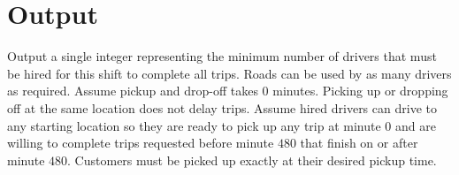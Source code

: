 \documentclass[11pt,letterpaper]{article}
\begin{document}
\section*{Output}
Output a single integer representing the minimum number of drivers that must be hired for this shift to complete all trips. Roads can be used by as many drivers as required. Assume pickup and drop-off takes $0$ minutes. Picking up or dropping off at the same location does not delay trips. Assume hired drivers can drive to any starting location so they are ready to pick up any trip at minute $0$ and are willing to complete trips requested before minute $480$ that finish on or after minute $480$. Customers must be picked up exactly at their desired pickup time.




\end{document}
